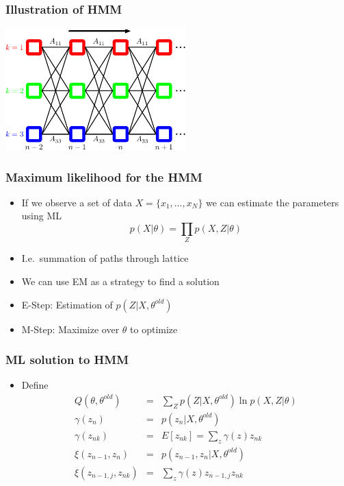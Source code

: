 \documentclass[10pt]{beamer}
\begin{document}
\begin{frame}
  \frametitle{Illustration of HMM}
  \begin{center}
    \includegraphics[width=7cm]{prml-Figure13-7}
  \end{center}
\end{frame}


\begin{frame}
  \frametitle{Maximum likelihood for the HMM}
  \begin{itemize}
  \item If we observe a set of data $X=\{ x_1, \ldots, x_N\}$ we can
    estimate the parameters using ML
    \[ p(X|\theta)=\prod_Z p(X, Z| \theta) \]
  \item I.e.\ summation of paths through lattice
  \item We can use EM as a strategy to find a solution
  \item E-Step: Estimation of $p(Z|X, \theta^{old})$
  \item M-Step: Maximize over $\theta$ to optimize
  \end{itemize}
\end{frame}

\begin{frame}
  \frametitle{ML solution to HMM}
  \begin{itemize}
  \item Define
    \begin{eqnarray*}
      Q(\theta,\theta^{old})&=&\sum_Z p(Z|X, \theta^{old}) \ln p(X,Z|\theta)\\
      \gamma(z_n)&=& p(z_n|X, \theta^{old})\\
      \gamma(z_{nk}) &=& E[z_{nk}] = \sum_z \gamma(z) z_{nk}\\
      \xi(z_{n-1}, z_n) &=& p(z_{n-1}, z_n| X, \theta^{old})\\
      \xi(z_{n-1,j}, z_{nk}) &=& \sum_z \gamma(z) z_{n-1,j} z_{nk}
    \end{eqnarray*}
  \end{itemize}
\end{frame}
\end{document}
